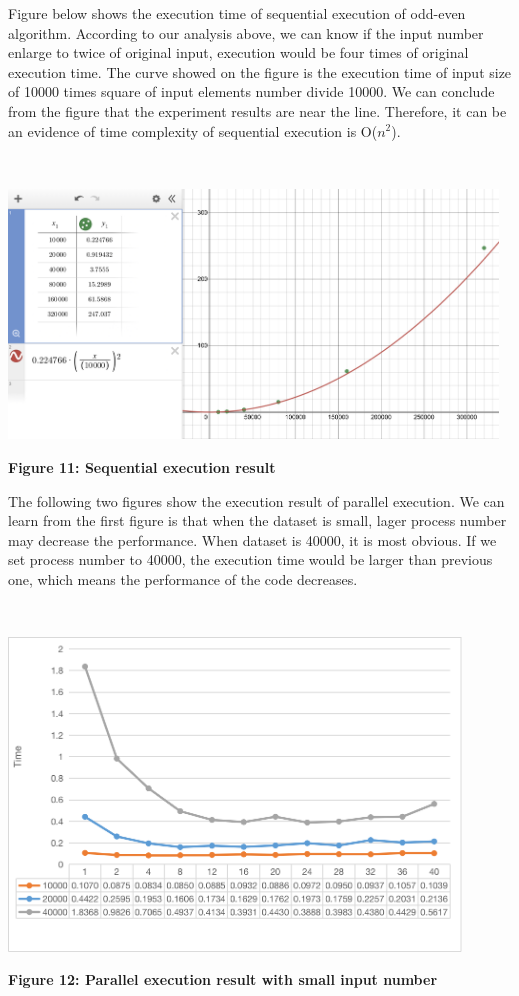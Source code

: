 Figure below shows the execution time of sequential execution of odd-even algorithm. According to our analysis above, we can know if the input number enlarge to twice of original input, execution would be four times of original execution time. The curve showed on the figure is the execution time of input size of 10000 times square of input elements number divide 10000. We can conclude from the figure that the experiment results are near the line. Therefore, it can be an evidence of time complexity of sequential execution is O($n^2$).

~\\
\centerline {\includegraphics[scale = 1, width=13cm]{seq_data}}
\centerline{\textbf {Figure 11: Sequential execution result}}

The following two figures show the execution result of parallel execution. We can learn from the first figure is that when the dataset is small, lager process number may decrease the performance. When dataset is 40000, it is most obvious. If we set process number to 40000, the execution time would be larger than previous one, which means the performance of the code decreases.

~\\
\centerline {\includegraphics[scale = 1, width=12cm]{small_data}}
\centerline{\textbf {Figure 12: Parallel execution result with small input number}}

